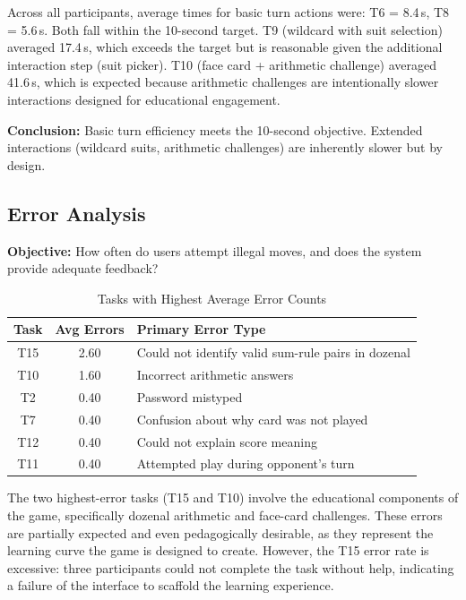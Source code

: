 \documentclass[12pt, titlepage]{article}
\begin{document}
Across all participants, average times for basic turn actions were: T6 = 8.4\,s, T8 = 5.6\,s. Both fall within the 10-second target. T9 (wildcard with suit selection) averaged 17.4\,s, which exceeds the target but is reasonable given the additional interaction step (suit picker). T10 (face card + arithmetic challenge) averaged 41.6\,s, which is expected because arithmetic challenges are intentionally slower interactions designed for educational engagement.

\textbf{Conclusion:} Basic turn efficiency meets the 10-second objective. Extended interactions (wildcard suits, arithmetic challenges) are inherently slower but by design.

\subsection{Error Analysis}

\textbf{Objective:} How often do users attempt illegal moves, and does the system provide adequate feedback?

\begin{table}[H]
\centering
\caption{Tasks with Highest Average Error Counts}
\begin{tabular}{c c l}
\toprule
\textbf{Task} & \textbf{Avg Errors} & \textbf{Primary Error Type} \\
\midrule
T15 & 2.60 & Could not identify valid sum-rule pairs in dozenal \\
T10 & 1.60 & Incorrect arithmetic answers \\
T2  & 0.40 & Password mistyped \\
T7  & 0.40 & Confusion about why card was not played \\
T12 & 0.40 & Could not explain score meaning \\
T11 & 0.40 & Attempted play during opponent's turn \\
\bottomrule
\end{tabular}
\end{table}

The two highest-error tasks (T15 and T10) involve the educational components of the game, specifically dozenal arithmetic and face-card challenges. These errors are partially expected and even pedagogically desirable, as they represent the learning curve the game is designed to create. However, the T15 error rate is excessive: three participants could not complete the task without help, indicating a failure of the interface to scaffold the learning experience.
\end{document}
